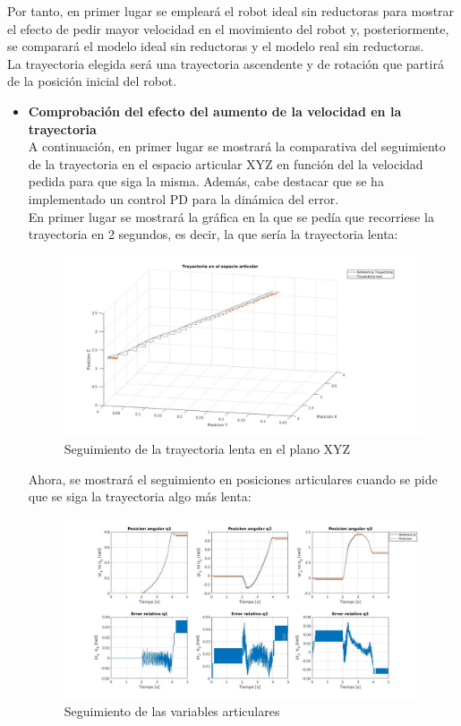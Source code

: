 Por tanto, en primer lugar se empleará el robot ideal sin reductoras para mostrar el efecto de pedir mayor velocidad en el movimiento del robot y, posteriormente, se comparará el modelo ideal sin reductoras y el modelo real sin reductoras.\\
La trayectoria elegida será una trayectoria ascendente y de rotación que partirá de la posición inicial del robot.

\begin{itemize}
	\item \textbf{Comprobación del efecto del aumento de la velocidad en la trayectoria} \\
	A continuación, en primer lugar se mostrará la comparativa del seguimiento de la trayectoria en el espacio articular XYZ en función del la velocidad pedida para que siga la misma. Además, cabe destacar que se ha implementado un control PD para la dinámica del error.\\
	En primer lugar se mostrará la gráfica en la que se pedía que recorriese la trayectoria en 2 segundos, es decir, la que sería la trayectoria lenta:

	\begin{figure}[h!]
		\centering
		\includegraphics[width=.8\textwidth]{exp4_trayPDidealSR_lento}
		\caption{Seguimiento de la trayectoria lenta en el plano XYZ}
	\end{figure}

	Ahora, se mostrará el seguimiento en posiciones articulares cuando se pide que se siga la trayectoria algo más lenta:

	\begin{figure}[h!]
		\centering
		\includegraphics[width=.8\textwidth]{exp4_posPDidealSR_lento}
		\caption{Seguimiento de las variables articulares}
	\end{figure}


\end{itemize}
